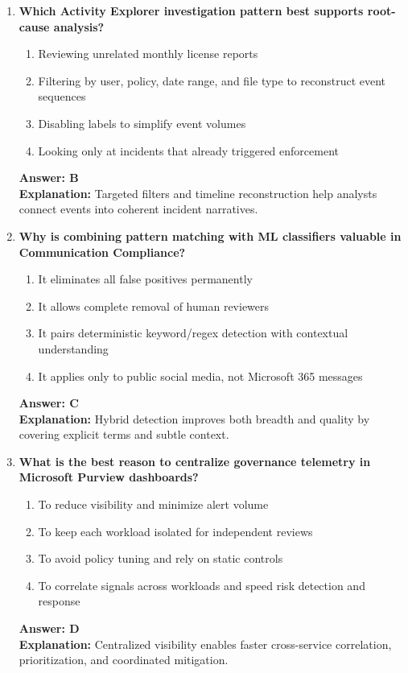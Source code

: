 \documentclass[10pt]{article}
\begin{document}
\begin{enumerate}[leftmargin=*]
\item \textbf{Which Activity Explorer investigation pattern best supports root-cause analysis?}
\begin{enumerate}[label=\Alph*.]
  \item Reviewing unrelated monthly license reports
  \item Filtering by user, policy, date range, and file type to reconstruct event sequences
  \item Disabling labels to simplify event volumes
  \item Looking only at incidents that already triggered enforcement
\end{enumerate}
\textbf{Answer: B}\\
\textbf{Explanation:} Targeted filters and timeline reconstruction help analysts connect events into coherent incident narratives.

\item \textbf{Why is combining pattern matching with ML classifiers valuable in Communication Compliance?}
\begin{enumerate}[label=\Alph*.]
  \item It eliminates all false positives permanently
  \item It allows complete removal of human reviewers
  \item It pairs deterministic keyword/regex detection with contextual understanding
  \item It applies only to public social media, not Microsoft 365 messages
\end{enumerate}
\textbf{Answer: C}\\
\textbf{Explanation:} Hybrid detection improves both breadth and quality by covering explicit terms and subtle context.

\item \textbf{What is the best reason to centralize governance telemetry in Microsoft Purview dashboards?}
\begin{enumerate}[label=\Alph*.]
  \item To reduce visibility and minimize alert volume
  \item To keep each workload isolated for independent reviews
  \item To avoid policy tuning and rely on static controls
  \item To correlate signals across workloads and speed risk detection and response
\end{enumerate}
\textbf{Answer: D}\\
\textbf{Explanation:} Centralized visibility enables faster cross-service correlation, prioritization, and coordinated mitigation.

\end{enumerate}
\end{document}
